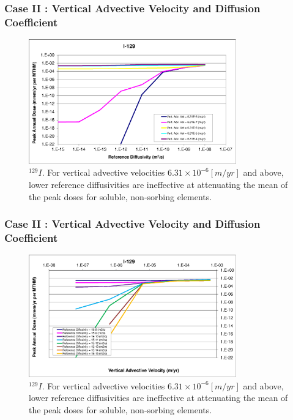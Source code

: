 \begin{frame}[c]
  \frametitle{Case II : Vertical Advective Velocity and Diffusion Coefficient}
\begin{figure}[htp!]
\centering
\includegraphics[width=0.8\textwidth]{AdvVelAndDiffCoeffEBSFail/I-129.eps}
\caption{$^{129}I$. For vertical advective velocities 
$6.31\times10^{-6}[m/yr]$ and above, lower reference diffusivities are 
ineffective at attenuating the mean of the peak doses for soluble, non-sorbing 
elements. 
}
\label{fig:VAdvVelI129}
\end{figure}
\end{frame}


\begin{frame}[c]
  \frametitle{Case II : Vertical Advective Velocity and Diffusion Coefficient}

\begin{figure}[ht!]
\centering
\includegraphics[width=0.8\textwidth]{AdvVelAndDiffCoeffEBSFail/I-129-VAdvVel.eps}
\caption{$^{129}I$.
For vertical advective velocities 
$6.31\times10^{-6}[m/yr]$ and above, lower reference diffusivities are 
ineffective at attenuating the mean of the peak doses for soluble, non-sorbing 
elements. 
}
\label{fig:VAdvVelI129VAdvVel}
\end{figure}
\end{frame}


